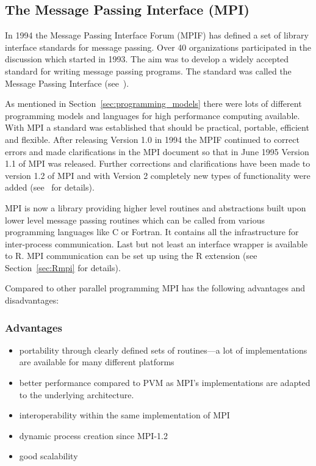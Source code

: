 \subsection{The Message Passing Interface (MPI)}
\label{sec:MPI}

In 1994 the Message Passing Interface Forum (MPIF) has defined a set
of library interface standards for message passing. Over 40
organizations participated in the discussion which started in
1993. The aim was to develop a widely accepted standard for writing
message passing programs. The standard was called the Message Passing
Interface (see~\cite{forum94:MPI}).

As mentioned in Section~\ref{sec:programming_models} there
were lots of different programming models and languages for high
performance computing available. With MPI a standard was established
that should be practical, portable, efficient and flexible. After
releasing Version 1.0 in 1994 the MPIF continued to correct errors and
made clarifications in the MPI document so that in June 1995 Version
1.1 of MPI was released. Further corrections and clarifications have
been made to version 1.2 of 
MPI and with Version 2 completely new types of functionality were
added (see~\cite{forum94:MPI-2} for details).

MPI is now a library providing higher level
routines and abstractions built upon lower level message passing
routines which can be called from various programming
languages like C or Fortran. It contains all the infrastructure for
inter-process communication. Last but not least an interface wrapper
is available to R. MPI communication can be set up using the R extension
 (see Section~\ref{sec:Rmpi} for details).


Compared to other parallel programming MPI has the following
advantages and disadvantages:

\subsubsection{Advantages}
\begin{itemize}
\item portability through clearly defined sets of routines---a lot of
  implementations are available for many different platforms
\item better performance compared to PVM as MPI's implementations are
  adapted to the underlying architecture.
\item interoperability within the same implementation of MPI
\item dynamic process creation since MPI-1.2
\item good scalability
\end{itemize} 

